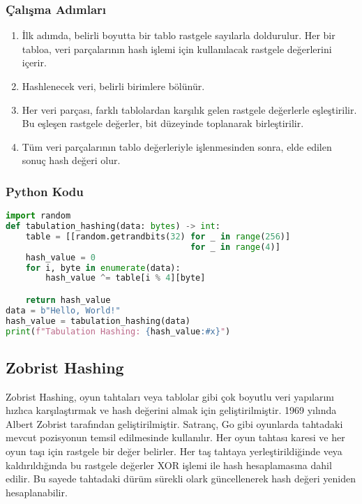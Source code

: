 \subsubsection{Çalışma Adımları}

\begin{enumerate}
    \item İlk adımda, belirli boyutta bir tablo rastgele sayılarla doldurulur. Her bir tabloa, veri parçalarının hash işlemi için kullanılacak rastgele değerlerini içerir.
    \item Hashlenecek veri, belirli birimlere bölünür.
    \item Her veri parçası, farklı tablolardan karşılık gelen rastgele değerlerle eşleştirilir. Bu eşleşen rastgele değerler, bit düzeyinde toplanarak birleştirilir.
    \item Tüm veri parçalarının tablo değerleriyle işlenmesinden sonra, elde edilen sonuç hash değeri olur.
\end{enumerate}

\subsubsection{Python Kodu}

\begin{lstlisting}[language=Python]
import random
def tabulation_hashing(data: bytes) -> int:
    table = [[random.getrandbits(32) for _ in range(256)] 
                                     for _ in range(4)]
    hash_value = 0
    for i, byte in enumerate(data):
        hash_value ^= table[i % 4][byte]

    return hash_value
data = b"Hello, World!"
hash_value = tabulation_hashing(data)
print(f"Tabulation Hashing: {hash_value:#x}")
\end{lstlisting}

\newpage

\subsection{Zobrist Hashing}

Zobrist Hashing, oyun tahtaları veya tablolar gibi çok boyutlu veri yapılarını hızlıca karşılaştırmak ve hash değerini almak için geliştirilmiştir. 1969 yılında Albert Zobrist tarafından geliştirilmiştir. Satranç, Go gibi oyunlarda tahtadaki mevcut pozisyonun temsil edilmesinde kullanılır. Her oyun tahtası karesi ve her oyun taşı için rastgele bir değer belirler. Her taş tahtaya yerleştirildiğinde veya kaldırıldığında bu rastgele değerler XOR işlemi ile hash hesaplamasına dahil edilir. Bu sayede tahtadaki dürüm sürekli olark güncellenerek hash değeri yeniden hesaplanabilir.

